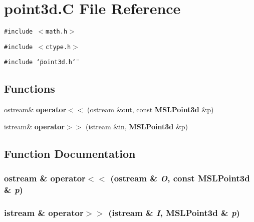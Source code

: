 \section{point3d.C File Reference}
\label{point3d_8C}
{\tt \#include $<$math.h$>$}\par
{\tt \#include $<$ctype.h$>$}\par
{\tt \#include \char`\"{}point3d.h\char`\"{}}\par
\subsection*{Functions}
\begin{CompactItemize}
\item 
ostream\& {\bf operator$<$$<$} (ostream \&out, const {\bf MSLPoint3d} \&p)
\item 
istream\& {\bf operator$>$$>$} (istream \&in, {\bf MSLPoint3d} \&p)
\end{CompactItemize}


\subsection{Function Documentation}
\subsubsection{\setlength{\rightskip}{0pt plus 5cm}ostream \& operator$<$$<$ (ostream \& {\em O}, const {\bf MSLPoint3d} \& {\em p})}\label{point3d_8C_a1}


\subsubsection{\setlength{\rightskip}{0pt plus 5cm}istream \& operator$>$$>$ (istream \& {\em I}, {\bf MSLPoint3d} \& {\em p})}\label{point3d_8C_a2}


